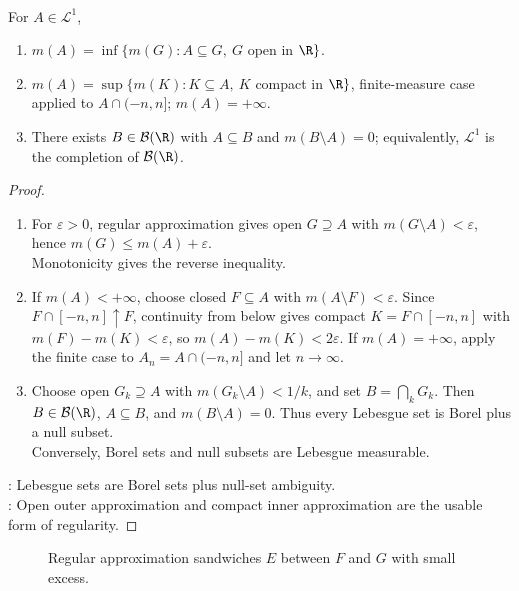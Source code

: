 \begin{corollary} \label{cor:lebesgue-regularity-and-borel-completion-real-line} \\
For $A\in\mathcal{L}^1$,
\begin{enumerate}[label=(\roman*)]
\setlength{\itemsep}{0pt}
\item $m(A)=\inf\{m(G):A\subseteq G,\ G$ open in $\R\}$.
\item $m(A)=\sup\{m(K):K\subseteq A,\ K$ compact in $\R\}$, finite-measure case applied to $A\cap(-n,n]$; $m(A)=+\infty$.
\item There exists $B\in\mathcal{B}(\R)$ with $A\subseteq B$ and $m(B\setminus A)=0$; equivalently, $\mathcal{L}^1$ is the completion of $\mathcal{B}(\R)$.
\end{enumerate}
\begin{proof}
\begin{enumerate}[label=(\roman*)]
\setlength{\itemsep}{0pt}
\item For $\varepsilon>0$, regular approximation gives open $G\supseteq A$ with $m(G\setminus A)<\varepsilon$, hence $m(G)\leq m(A)+\varepsilon$.\\
Monotonicity gives the reverse inequality.
\item If $m(A)<+\infty$, choose closed $F\subseteq A$ with $m(A\setminus F)<\varepsilon$. Since $F\cap[-n,n]\uparrow F$, continuity from below gives compact $K=F\cap[-n,n]$ with $m(F)-m(K)<\varepsilon$, so $m(A)-m(K)<2\varepsilon$. If $m(A)=+\infty$, apply the finite case to $A_n=A\cap(-n,n]$ and let $n\to\infty$.
\item Choose open $G_k\supseteq A$ with $m(G_k\setminus A)<1/k$, and set $B=\bigcap_kG_k$. Then $B\in\mathcal{B}(\R)$, $A\subseteq B$, and $m(B\setminus A)=0$. Thus every Lebesgue set is Borel plus a null subset.\\
Conversely, Borel sets and null subsets are Lebesgue measurable.
\end{enumerate}
: Lebesgue sets are Borel sets plus null-set ambiguity.\\
: Open outer approximation and compact inner approximation are the usable form of regularity.
\end{proof}
\end{corollary}

\begin{figure}[H]
  \centering
  
  \caption{Regular approximation sandwiches $E$ between $F$ and $G$ with small excess.}
  \label{fig:regular-approximation-sandwich}
\end{figure}

